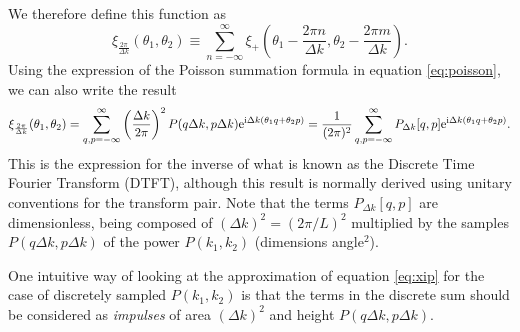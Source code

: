 \documentclass[preprint]{aastex}
\newcommand{\mi}{{\rm i}}
\newcommand{\me}{{\rm e}}
\begin{document}
We therefore define this function as
\begin{equation}
\xi_{\frac{2\pi}{\Delta k}}(\theta_1, \theta_2) \equiv \sum_{n = -\infty}^{\infty} \xi_+\left(\theta_1
- \frac{2 \pi n}{\Delta k},  \theta_2
- \frac{2 \pi m}{\Delta k} \right).
\end{equation}
Using the expression of the Poisson summation formula in equation
\eqref{eq:poisson}, we can also write the result
\begin{equation}
\xi_{\frac{2\pi}{\Delta k}}(\theta_1, \theta_2) =
\sum_{q,p=-\infty}^{\infty} \left( \frac{\Delta k}{2 \pi} \right)^2 P(q \Delta k, p \Delta k) \me^{\mi \Delta
  k (\theta_1 q + \theta_2 p)} = \frac{1}{( 2 \pi)^2}
\sum_{q,p=-\infty}^{\infty} P_{\Delta k} [q, p] \me^{\mi \Delta
  k (\theta_1 q + \theta_2 p)}. \label{eq:dtft}
\end{equation}
This is the expression for the inverse of what is known as the
Discrete Time Fourier Transform (DTFT), although this result is
normally derived using unitary conventions for the transform pair.
Note that the terms $P_{\Delta k}[q, p]$ are dimensionless, being
composed of $(\Delta k)^2 = (2 \pi / L)^2$ multiplied by the samples $P(q \Delta k, p \Delta
k)$ of the power $P(k_1, k_2)$ (dimensions angle$^2$).  

One intuitive way of looking at the approximation of equation \eqref{eq:xip} for the case of discretely
sampled $P(k_1, k_2)$ is that the terms in the discrete sum should be
considered as \emph{impulses} of area $(\Delta k)^2$ and height $P(q \Delta k, p \Delta k)$.
\end{document}
